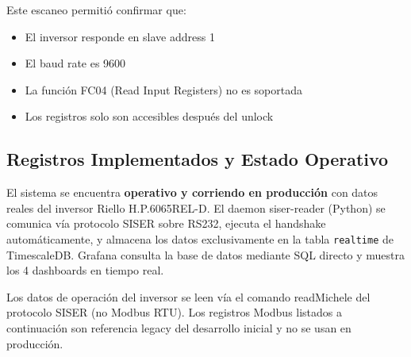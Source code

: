 \documentclass[12pt,a4paper]{article}
\begin{document}
Este escaneo permiti\'o confirmar que:
\begin{itemize}
    \item El inversor responde en slave address 1
    \item El baud rate es 9600
    \item La funci\'on FC04 (Read Input Registers) no es soportada
    \item Los registros solo son accesibles despu\'es del unlock
\end{itemize}

\subsection{Registros Implementados y Estado Operativo}

El sistema se encuentra \textbf{operativo y corriendo en producci\'on} con datos reales del inversor Riello H.P.6065REL-D. El daemon siser-reader (Python) se comunica v\'ia protocolo SISER sobre RS232, ejecuta el handshake autom\'aticamente, y almacena los datos exclusivamente en la tabla \texttt{realtime} de TimescaleDB. Grafana consulta la base de datos mediante SQL directo y muestra los 4 dashboards en tiempo real.

Los datos de operaci\'on del inversor se leen v\'ia el comando readMichele del protocolo SISER (no Modbus RTU). Los registros Modbus listados a continuaci\'on son referencia legacy del desarrollo inicial y no se usan en producci\'on.
\end{document}
